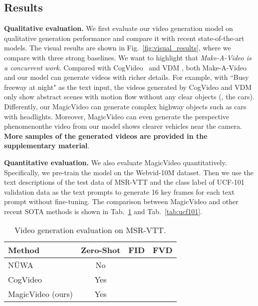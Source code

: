 \documentclass[10pt,twocolumn,letterpaper]{article}
\newcommand{\myPara}[1]{\vspace{6pt}\noindent\textbf{#1}}
\begin{document}
\subsection{Results}



\myPara{Qualitative evaluation.}
We first evaluate our video generation model on qualitative generation performance and compare it with recent state-of-the-art  models. The visual results are shown in Fig.~\ref{fig:visual_results}, where we compare  with three strong baselines. We want to highlight that \textit{Make-A-Video is a concurrent work}. Compared with CogVideo~\cite{CogVideo} and VDM \cite{ho2022video}, both Make-A-Video and our model can generate videos with richer details. For example, with ``Busy freeway at night" as the text input, the videos generated by CogVideo  and VDM  only show abstract scenes with motion flow without any clear objects (\eg, the cars). Differently,   our MagicVideo can generate complex highway objects such as cars with headlights. Moreover, MagicVideo can even generate the perspective phenomenon\textemdash the video from our model shows clearer vehicles near the camera. \textbf{More samples of the generated videos are provided in the supplementary material}.



\myPara{Quantitative evaluation.}
We also evaluate MagicVideo quantitatively. Specifically, we pre-train  the model   on the Webvid-10M dataset. Then we use the text descriptions of the test data of   MSR-VTT   and the class label of   UCF-101 validation data as the text prompts to generate 16 key frames for each text prompt without fine-tuning. The comparison between MagicVideo and other recent SOTA methods is  shown in   Tab.~\ref{tab:msrvtt} and Tab.~\ref{tab:ucf101}.


\begin{table}[t]
\small
\caption{Video generation evaluation on MSR-VTT. }
\label{tab:msrvtt}
\centering
\begin{tabular}{@{}l|ccc@{}}
Method & Zero-Shot  & FID  & FVD   \\
\toprule
NÜWA~\cite{wu2022nuwa} & No &   &  \\
CogVideo~\cite{CogVideo}  & Yes &   &  \\
MagicVideo (ours) & Yes &  &  \\
\end{tabular}
\end{table}
\end{document}
